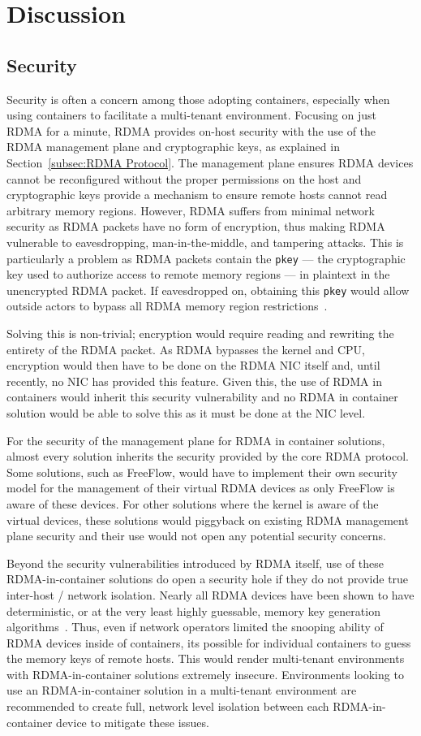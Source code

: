 \documentclass[12pt,titlepage]{article}
\begin{document}
\section{Discussion}
\subsection{Security}
Security is often a concern among those adopting containers, especially when using containers to facilitate a multi-tenant environment.
Focusing on just RDMA for a minute, RDMA provides on-host security with the use of the RDMA management plane and cryptographic keys, as explained in Section~\ref{subsec:RDMA Protocol}.
The management plane ensures RDMA devices cannot be reconfigured without the proper permissions on the host and cryptographic keys provide a mechanism to ensure remote hosts cannot read arbitrary memory regions.
However, RDMA suffers from minimal network security as RDMA packets have no form of encryption, thus making RDMA vulnerable to eavesdropping, man-in-the-middle, and tampering attacks.
This is particularly a problem as RDMA packets contain the \texttt{pkey} --- the cryptographic key used to authorize access to remote memory regions --- in plaintext in the unencrypted RDMA packet.
If eavesdropped on, obtaining this \texttt{pkey} would allow outside actors to bypass all RDMA memory region restrictions~\cite{rdmasecurity}.

Solving this is non-trivial; encryption would require reading and rewriting the entirety of the RDMA packet. 
As RDMA bypasses the kernel and CPU, encryption would then have to be done on the RDMA NIC itself and, until recently, no NIC has provided this feature.
Given this, the use of RDMA in containers would inherit this security vulnerability and no RDMA in container solution would be able to solve this as it must be done at the NIC level.

For the security of the management plane for RDMA in container solutions, almost every solution inherits the security provided by the core RDMA protocol.
Some solutions, such as FreeFlow, would have to implement their own security model for the management of their virtual RDMA devices as only FreeFlow is aware of these devices.
For other solutions where the kernel is aware of the virtual devices, these solutions would piggyback on existing RDMA management plane security and their use would not open any potential security concerns.

Beyond the security vulnerabilities introduced by RDMA itself, use of these RDMA-in-container solutions do open a security hole if they do not provide true inter-host / network isolation.
Nearly all RDMA devices have been shown to have deterministic, or at the very least highly guessable, memory key generation algorithms~\cite{redmark}.
Thus, even if network operators limited the snooping ability of RDMA devices inside of containers, its possible for individual containers to guess the memory keys of remote hosts.
This would render multi-tenant environments with RDMA-in-container solutions extremely insecure.
Environments looking to use an RDMA-in-container solution in a multi-tenant environment are recommended to create full, network level isolation between each RDMA-in-container device to mitigate these issues.
\end{document}
